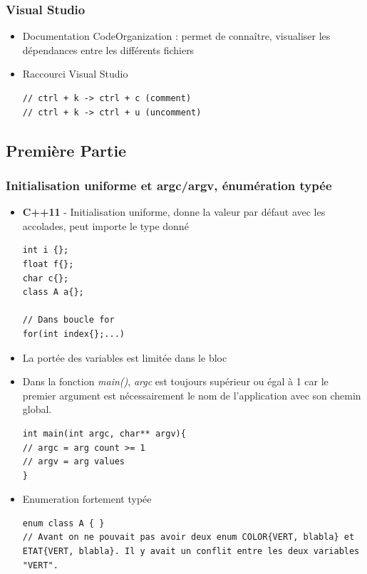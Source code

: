 \documentclass[12pt,a4paper]{article}
\begin{document}
\subsubsection{Visual Studio}
\begin{itemize}
\item Documentation CodeOrganization : permet de connaître, visualiser les dépendances entre les différents fichiers
\item Raccourci Visual Studio
\begin{lstlisting}
// ctrl + k -> ctrl + c (comment)
// ctrl + k -> ctrl + u (uncomment)
\end{lstlisting}
\end{itemize}

\subsection{Première Partie}
\subsubsection{Initialisation uniforme et argc/argv, énumération typée}
\begin{itemize}
\item \textbf{C++11} - Initialisation uniforme, donne la valeur par défaut avec les accolades, peut importe le type donné
\begin{lstlisting}
int i {};
float f{};
char c{};
class A a{};

// Dans boucle for
for(int index{};...)
\end{lstlisting}
\item La portée des variables est limitée dans le bloc
\item Dans la fonction \textit{main()}, \textit{argc} est toujours supérieur ou égal à 1 car le premier argument est nécessairement le nom de l'application avec son chemin global.
\begin{lstlisting}
int main(int argc, char** argv){
// argc = arg count >= 1
// argv = arg values
}
\end{lstlisting}
\item Enumeration fortement typée
\begin{lstlisting}
enum class A { }
// Avant on ne pouvait pas avoir deux enum COLOR{VERT, blabla} et ETAT{VERT, blabla}. Il y avait un conflit entre les deux variables "VERT".
\end{lstlisting}
\end{itemize}
\end{document}
